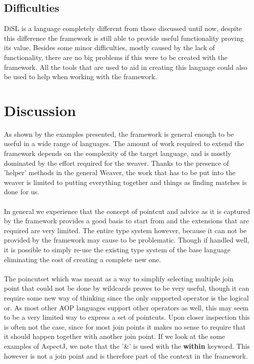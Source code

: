 \documentclass[a4paper]{report}
\begin{document}
\section{Difficulties}
DiSL is a language completely different from those discussed until now, despite this difference the framework is still able to provide useful functionality proving its value. Besides some minor difficulties, mostly caused by the lack of functionality, there are no big problems if this were to be created with the framework. All the tools that are used to aid in creating this language could also be used to help when working with the framework.

\chapter{Discussion}
\label{chap:Discussion}
As shown by the examples presented, the framework is general enough to be useful in a wide range of languages. The amount of work required to extend the framework depends on the complexity of the target language, and is mostly dominated by the effort required for the weaver. Thanks to the presence of 'helper' methods in the general Weaver, the work that has to be put into the weaver is limited to putting everything together and things as finding matches is done for us.\\
\\
In general we experience that the concept of pointcut and advice as it is captured by the framework provides a good basis to start from and the extensions that are required are very limited. The entire type system however, because it can not be provided by the framework may cause to be problematic. Though if handled well, it is possible to simply re-use the existing type system of the base language eliminating the cost of creating a complete new one.\\
\\
The poincutset which was meant as a way to simplify selecting multiple join point that could not be done by wildcards proves to be very useful, though it can require some new way of thinking since the only supported operator is the logical or. As most other AOP languages support other operators as well, this may seem to be a very limited way to express a set of pointcuts. Upon closer inspection this is often not the case, since for most join points it makes no sense to require that it should happen together with another join point. If we look at the some examples of AspectJ, we note that the '\&' is used with the \textbf{within} keyword. This however is not a join point and is therefore part of the context in the framework.\\
\end{document}
